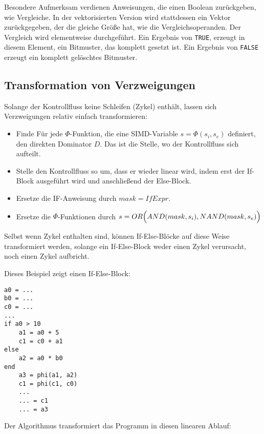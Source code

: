 \documentclass[a4paper,10pt]{article}
\begin{document}
Besondere Aufmerksam verdienen Anweisungen, die einen Boolean zurückgeben, wie Vergleiche.  In der
vektorisierten Version wird stattdessen ein Vektor zurückgegeben, der die gleiche Größe hat, wie die
Vergleichsoperanden. Der Vergleich wird elementweise durchgeführt. Ein Ergebnis von \texttt{TRUE},
erzeugt in diesem Element, ein Bitmuster, das komplett gesetzt ist. Ein Ergebnis von \texttt{FALSE}
erzeugt ein komplett gelöschtes Bitmuster.

\subsection{Transformation von Verzweigungen}

Solange der Kontrollfluss keine Schleifen (Zykel) enthält, lassen sich Verzweigungen 
relativ einfach transformieren:

\begin{itemize}

    \item Finde Für jede $\Phi$-Funktion, die eine SIMD-Variable $s = \Phi(s_i, s_e)$ definiert, den
    direkten Dominator $D$.  Das ist die Stelle, wo der Kontrollfluss sich aufteilt. 

    \item Stelle den Kontrollfluss so um, dass er wieder linear wird, indem erst der If-Block ausgeführt wird
    und anschließend der Else-Block. 
    
    \item Ersetze die IF-Anweisung durch $mask = IfExpr$.

    \item Ersetze die $\Phi$-Funktionen durch $s = OR\Bigl( AND(mask, s_i), NAND(mask, s_e)\Bigr)$

\end{itemize}

Selbst wenn Zykel enthalten sind, können If-Else-Blöcke auf diese Weise transformiert werden,
solange ein If-Else-Block weder einen Zykel verursacht, noch einen Zykel aufbricht.

Dieses Beispiel zeigt einen If-Else-Block:

\begin{verbatim}
a0 = ...
b0 = ...
c0 = ...
...
if a0 > 10 
    a1 = a0 + 5
    c1 = c0 + a1
else
    a2 = a0 * b0
end
    a3 = phi(a1, a2)
    c1 = phi(c1, c0)
    ...
    ... = c1
    ... = a3
\end{verbatim}

Der Algorithmus transformiert das Programm in diesen linearen Ablauf:
\end{document}
